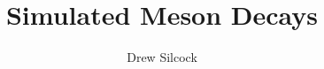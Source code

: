 \documentclass[]{article}
\title{Simulated Meson Decays}
\author{Drew Silcock}
\begin{document}
\maketitle

\begin{multicols}{2}









\end{multicols}

\newpage
\printbibliography
\end{document}
